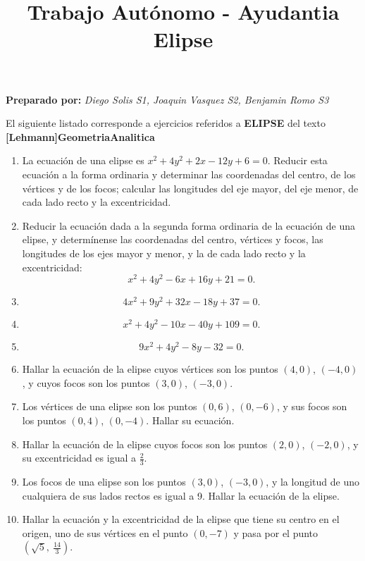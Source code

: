 \documentclass[12pt,a4paper]{article}
\title{\LARGE Trabajo Autónomo - Ayudantia\\ Elipse}
\author{}
\date{}
\begin{document}
\maketitle

\vspace{0.3cm}
\centering
\textbf{Preparado por:} \textit{Diego Solis S1, Joaquin Vasquez S2, Benjamin Romo S3}
\par
\vspace{0.7cm}

El siguiente listado corresponde a ejercicios referidos a \textbf{ELIPSE} del texto \textbf{[Lehmann]GeometriaAnalitica}

\begin{enumerate}
\item La ecuación de una elipse es \( x^2 + 4y^2 + 2x - 12y + 6 = 0 \).
Reducir esta ecuación a la forma ordinaria y determinar las coordenadas del centro,
de los vértices y de los focos; calcular las longitudes del eje mayor, del eje menor,
de cada lado recto y la excentricidad.
\item Reducir la ecuación dada a la segunda forma ordinaria de la ecuación de una elipse,
y determínense las coordenadas del centro, vértices y focos, las longitudes de los ejes
mayor y menor, y la de cada lado recto y la excentricidad:
\[ x^2 + 4y^2 - 6x + 16y + 21 = 0. \]
\item \[ 4x^2 + 9y^2 + 32x - 18y + 37 = 0. \]
\item \[ x^2 + 4y^2 - 10x - 40y + 109 = 0. \]
\item \[ 9x^2 + 4y^2 - 8y - 32 = 0. \]
\item Hallar la ecuación de la elipse cuyos vértices son los puntos \((4,0)\), \((-4,0)\),
y cuyos focos son los puntos \((3,0)\), \((-3,0)\).
\item Los vértices de una elipse son los puntos \((0,6)\), \((0,-6)\), y sus focos son
los puntos \((0,4)\), \((0,-4)\). Hallar su ecuación.
\item Hallar la ecuación de la elipse cuyos focos son los puntos \((2,0)\), \((-2,0)\),
y su excentricidad es igual a \( \frac{2}{3} \).
\item Los focos de una elipse son los puntos \((3,0)\), \((-3,0)\), y la longitud de uno
cualquiera de sus lados rectos es igual a 9. Hallar la ecuación de la elipse.
\item Hallar la ecuación y la excentricidad de la elipse que tiene su centro en el origen,
uno de sus vértices en el punto \((0,-7)\) y pasa por el punto \( \left( \sqrt{5},\ \frac{14}{3} \right) \).

\end{enumerate}
\end{document}
